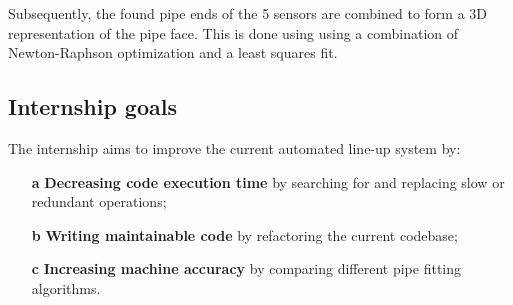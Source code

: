Subsequently, the found pipe ends of the 5 sensors are combined to form a 3D representation of the pipe face.
This is done using using a combination of Newton-Raphson optimization and a least squares fit.

\subsection{Internship goals} \label{ssec:intern_goals}
The internship aims to improve the current automated line-up system by:
\begin{enumerate}
      \item [\textbf{a}] \textbf{Decreasing code execution time} by searching for and replacing
      slow or redundant operations;
      \item [\textbf{b}] \textbf{Writing maintainable code} by refactoring the current codebase;
      \item [\textbf{c}] \textbf{Increasing machine accuracy} by comparing different pipe fitting algorithms.
\end{enumerate}
